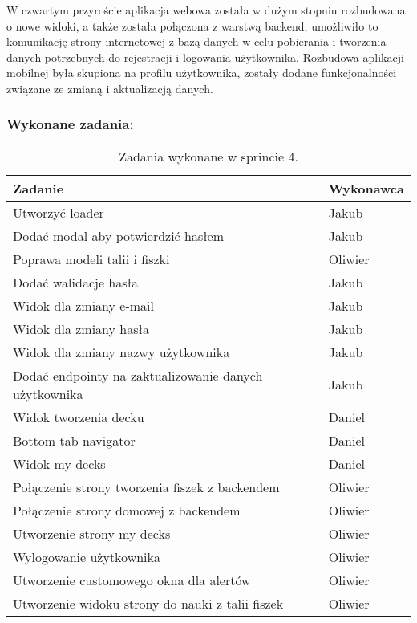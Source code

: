 W czwartym przyroście aplikacja webowa została w dużym stopniu rozbudowana o nowe widoki, a także została połączona z warstwą backend, umożliwiło to komunikację strony internetowej z bazą danych w celu pobierania i tworzenia danych potrzebnych do rejestracji i logowania użytkownika. Rozbudowa aplikacji mobilnej  była skupiona na profilu użytkownika, zostały dodane funkcjonalności związane ze zmianą i aktualizacją danych.

\subsubsection{Wykonane zadania:}

\begin{table}[H]
\centering
\begin{tabularx}{\textwidth}{|p{}|X|}
    \hline
    \textbf{Zadanie} & \textbf{Wykonawca} \\
    \hline
    [MOBILE] Utworzyć loader & Jakub \\
    \hline
    [MOBILE] Dodać modal aby potwierdzić hasłem & Jakub \\
    \hline
    [BACKEND] Poprawa modeli talii i fiszki & Oliwier \\
    \hline
    [MOBILE] Dodać walidacje hasła & Jakub \\
    \hline
    [MOBILE] Widok dla zmiany e-mail & Jakub \\
    \hline
    [MOBILE] Widok dla zmiany hasła & Jakub \\
    \hline
    [MOBILE] Widok dla zmiany nazwy użytkownika & Jakub \\
    \hline
    [BACKEND] Dodać endpointy na zaktualizowanie danych użytkownika & Jakub \\
    \hline
    [MOBILE] Widok tworzenia decku & Daniel \\
    \hline
    [MOBILE] Bottom tab navigator & Daniel \\
    \hline
    [MOBILE] Widok my decks & Daniel \\
    \hline
    [WEB] Połączenie strony tworzenia fiszek z backendem & Oliwier \\
    \hline
    [WEB] Połączenie strony domowej z backendem & Oliwier \\
    \hline
    [WEB] Utworzenie strony my decks & Oliwier \\
    \hline
    [WEB] Wylogowanie użytkownika & Oliwier \\
    \hline
    [WEB] Utworzenie customowego okna dla alertów & Oliwier \\
    \hline
    [WEB] Utworzenie widoku strony do nauki z talii fiszek & Oliwier \\
    \hline
\end{tabularx}
            \caption{Zadania wykonane w sprincie 4.}
\end{table}

